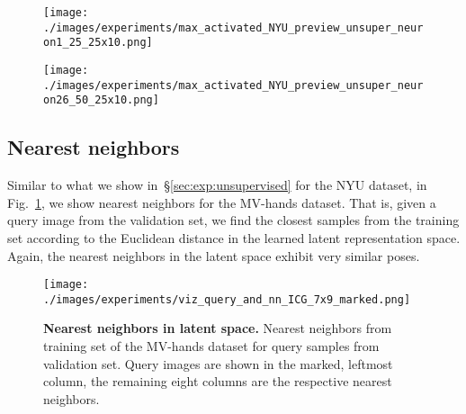\documentclass[10pt,twocolumn,letterpaper]{article}
\begin{document}
\begin{figure*}[t]
  \centering
  \begin{subfigure}{0.48\linewidth}
    \texttt{[image: ./images/experiments/max\_activated\_NYU\_preview\_unsuper\_neuron1\_25\_25x10.png]}
  \end{subfigure}
  \quad
  \begin{subfigure}{0.48\linewidth}
    \texttt{[image: ./images/experiments/max\_activated\_NYU\_preview\_unsuper\_neuron26\_50\_25x10.png]}
  \end{subfigure}
  \caption{\textbf{Most activating samples.}
  Each row on the left and right side shows the ten samples from the validation set, 
  which activate the same neuron in the learned latent representation most.
  Note, that we randomly perturbed detections to verify the robustness of our method.
  Hence, sometimes parts of the hand are cut off in the crops.}
  \label{fig:topactivated}
\end{figure*}\vspace{0.7em}\subsection{Nearest neighbors}\label{sup:sec:nearestneighbors}
Similar to what we show in~\S\ref{sec:exp:unsupervised} for the NYU dataset,
in Fig.~\ref{fig:exp:sup:nearestneighbors}, we show nearest neighbors for the MV-hands dataset.
That is, given a query image from the validation set, we find the closest samples
from the training set according to the Euclidean distance in the learned latent 
representation space.
Again, the nearest neighbors in the latent space exhibit very similar poses.

\begin{figure}[t]
  \centering
  \texttt{[image: ./images/experiments/viz\_query\_and\_nn\_ICG\_7x9\_marked.png]}
  \caption[]{\textbf{Nearest neighbors in latent space.}
  Nearest neighbors from training set of the MV-hands dataset for 
  query samples from validation set.
  Query images are shown in the marked, leftmost column, 
  the remaining eight columns are the respective nearest neighbors.}
  \label{fig:exp:sup:nearestneighbors}
\end{figure}
\end{document}
